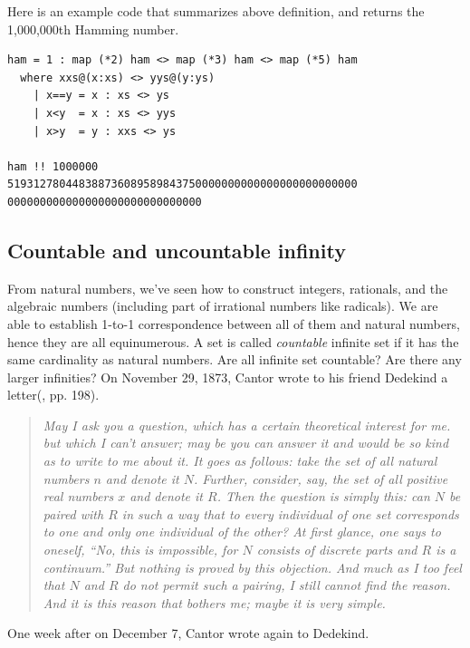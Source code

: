 \documentclass{article}
\begin{document}
Here is an example code that summarizes above definition, and returns the 1,000,000th Hamming number.

\begin{lstlisting}
ham = 1 : map (*2) ham <> map (*3) ham <> map (*5) ham
  where xxs@(x:xs) <> yys@(y:ys)
    | x==y = x : xs <> ys
    | x<y  = x : xs <> yys
    | x>y  = y : xxs <> ys

ham !! 1000000
519312780448388736089589843750000000000000000000000000
000000000000000000000000000000
\end{lstlisting}

\lstset{frame=none}

\subsection{Countable and uncountable infinity}
From natural numbers, we've seen how to construct integers, rationals, and the algebraic numbers (including part of irrational numbers like radicals). We are able to establish 1-to-1 correspondence between all of them and natural numbers, hence they are all equinumerous. A set is called {\em countable} infinite set if it has the same cardinality as natural numbers. Are all infinite set countable? Are there any larger infinities? On November 29, 1873, Cantor wrote to his friend Dedekind a letter(\cite{Calvin-Clawson-1994}, pp. 198).

\begin{quotation}
\itshape
May I ask you a question, which has a certain theoretical interest for me. but which I can't answer; may be you can answer it and would be so kind as to write to me about it. It goes as follows: take the set of all natural numbers $n$ and denote it $N$. Further, consider, say, the set of all positive real numbers $x$ and denote it $R$. Then the question is simply this: can $N$ be paired with $R$ in such a way that to every individual of one set corresponds to one and only one individual of the other? At first glance, one says to oneself, ``No, this is impossible, for $N$ consists of discrete parts and $R$ is a continuum.'' But nothing is proved by this objection. And much as I too feel that $N$ and $R$ do not permit such a pairing, I still cannot find the reason. And it is this reason that bothers me; maybe it is very simple.
\end{quotation}


One week after on December 7, Cantor wrote again to Dedekind.
\end{document}
